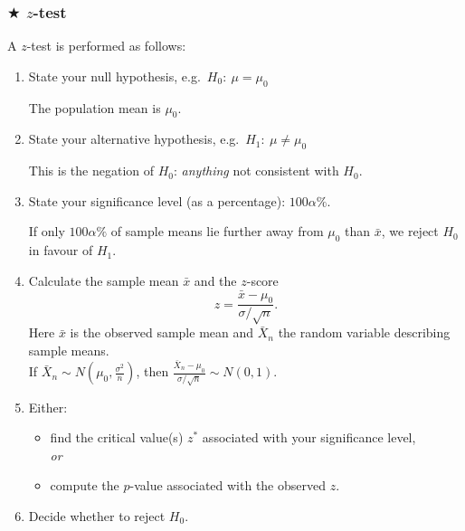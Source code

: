 \documentclass[t,8pt]{beamer}
\begin{document}
\begin{frame}
	\frametitle{$\bigstar$ $z$-test}
	A $z$-test is performed as follows:
	\begin{enumerate}
		\item State your null hypothesis, e.g.\ $H_0:\ \mu=\mu_0$ \par
		{\small\color{NavyBlue} The population mean is $\mu_0$.}
		\item State your alternative hypothesis, e.g.\ $H_1:\ \mu\neq\mu_0$ \par
		{\small\color{NavyBlue} This is the negation of $H_0$: \emph{anything} not consistent with $H_0$.}
		\item State your significance level (as a percentage): $100\alpha\%$. \par
		{\small\color{NavyBlue} If only $100\alpha\%$ of sample means lie further away from $\mu_0$ than $\bar x$, we reject $H_0$ in favour of $H_1$.}
		\item Calculate the sample mean $\bar x$ and the $z$-score
		\[
		z=\frac{\bar x-\mu_0}{\sigma/\sqrt n}.
		\]
		{\small\color{NavyBlue}
			Here $\bar x$ is the observed sample mean and $\bar X_n$ the random variable describing sample means. \\
			If $\bar X_n\sim N\!\left(\mu_0,\frac{\sigma^2}{n}\right)$, then
			\(
			\frac{\bar X_n-\mu_0}{\sigma/\sqrt n}\sim N(0,1).
			\)
		}
		\item Either:
		\begin{itemize}
			\item find the critical value(s) $z^*$ associated with your significance level, \\
			\emph{or}
			\item compute the $p$-value associated with the observed $z$.
		\end{itemize}
		\item Decide whether to reject $H_0$.
	\end{enumerate}
\end{frame}
\end{document}
